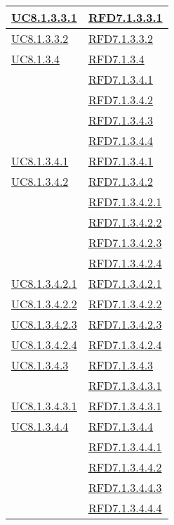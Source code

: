 \begin{longtable}{|>{\centering}m{5cm}|m{5cm}<{\centering}|}
\hyperref[UC8.1.3.3.1]{UC8.1.3.3.1} & \hyperlink{RFD7.1.3.3.1}{RFD7.1.3.3.1}\\ \hline
\hyperref[UC8.1.3.3.2]{UC8.1.3.3.2} & \hyperlink{RFD7.1.3.3.2}{RFD7.1.3.3.2}\\ \hline
\hyperref[UC8.1.3.4]{UC8.1.3.4} & \hyperlink{RFD7.1.3.4}{RFD7.1.3.4}\\
& \hyperlink{RFD7.1.3.4.1}{RFD7.1.3.4.1}\\
& \hyperlink{RFD7.1.3.4.2}{RFD7.1.3.4.2}\\
& \hyperlink{RFD7.1.3.4.3}{RFD7.1.3.4.3}\\
& \hyperlink{RFD7.1.3.4.4}{RFD7.1.3.4.4}\\ \hline
\hyperref[UC8.1.3.4.1]{UC8.1.3.4.1} & \hyperlink{RFD7.1.3.4.1}{RFD7.1.3.4.1}\\ \hline
\hyperref[UC8.1.3.4.2]{UC8.1.3.4.2} & \hyperlink{RFD7.1.3.4.2}{RFD7.1.3.4.2}\\
& \hyperlink{RFD7.1.3.4.2.1}{RFD7.1.3.4.2.1}\\
& \hyperlink{RFD7.1.3.4.2.2}{RFD7.1.3.4.2.2}\\
& \hyperlink{RFD7.1.3.4.2.3}{RFD7.1.3.4.2.3}\\
& \hyperlink{RFD7.1.3.4.2.4}{RFD7.1.3.4.2.4}\\ \hline
\hyperref[UC8.1.3.4.2.1]{UC8.1.3.4.2.1} & \hyperlink{RFD7.1.3.4.2.1}{RFD7.1.3.4.2.1}\\ \hline
\hyperref[UC8.1.3.4.2.2]{UC8.1.3.4.2.2} & \hyperlink{RFD7.1.3.4.2.2}{RFD7.1.3.4.2.2}\\ \hline
\hyperref[UC8.1.3.4.2.3]{UC8.1.3.4.2.3} & \hyperlink{RFD7.1.3.4.2.3}{RFD7.1.3.4.2.3}\\ \hline
\hyperref[UC8.1.3.4.2.4]{UC8.1.3.4.2.4} & \hyperlink{RFD7.1.3.4.2.4}{RFD7.1.3.4.2.4}\\ \hline
\hyperref[UC8.1.3.4.3]{UC8.1.3.4.3} & \hyperlink{RFD7.1.3.4.3}{RFD7.1.3.4.3}\\
& \hyperlink{RFD7.1.3.4.3.1}{RFD7.1.3.4.3.1}\\ \hline
\hyperref[UC8.1.3.4.3.1]{UC8.1.3.4.3.1} & \hyperlink{RFD7.1.3.4.3.1}{RFD7.1.3.4.3.1}\\ \hline
\hyperref[UC8.1.3.4.4]{UC8.1.3.4.4} & \hyperlink{RFD7.1.3.4.4}{RFD7.1.3.4.4}\\
& \hyperlink{RFD7.1.3.4.4.1}{RFD7.1.3.4.4.1}\\
& \hyperlink{RFD7.1.3.4.4.2}{RFD7.1.3.4.4.2}\\
& \hyperlink{RFD7.1.3.4.4.3}{RFD7.1.3.4.4.3}\\
& \hyperlink{RFD7.1.3.4.4.4}{RFD7.1.3.4.4.4}\\ \hline

\end{longtable}
